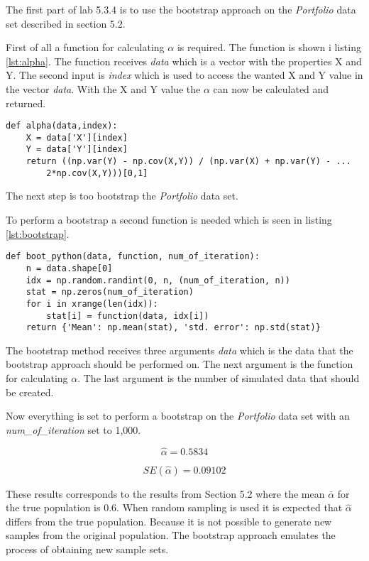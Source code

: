The first part of lab 5.3.4 is to use the bootstrap approach on the \emph{Portfolio} data set described in section 5.2\citep{ISLR}.

First of all a function for calculating $\alpha$ is required. The function is shown i listing \ref{lst:alpha}. The function receives \emph{data} which is a vector with the properties X and Y. The second input is \emph{index} which is used to access the wanted X and Y value in the vector \emph{data}.
With the X and Y value the $\alpha$ can now be calculated and returned.

\begin{lstlisting}[caption={Function for calculating $\alpha$ in python}, label=lst:alpha, mathescape=true]
def alpha(data,index):
	X = data['X'][index]
	Y = data['Y'][index]
	return ((np.var(Y) - np.cov(X,Y)) / (np.var(X) + np.var(Y) - ...
		2*np.cov(X,Y)))[0,1]
\end{lstlisting}

The next step is too bootstrap the \emph{Portfolio} data set.

To perform a bootstrap a second function is needed which is seen in listing \ref{lst:bootstrap}.

\begin{lstlisting}[caption={Bootstrap function in python}, label=lst:bootstrap, mathescape=true]
def boot_python(data, function, num_of_iteration):
	n = data.shape[0]
	idx = np.random.randint(0, n, (num_of_iteration, n))
	stat = np.zeros(num_of_iteration)
	for i in xrange(len(idx)):
		stat[i] = function(data, idx[i])
	return {'Mean': np.mean(stat), 'std. error': np.std(stat)}
\end{lstlisting}

The bootstrap method receives three arguments \emph{data} which is the data that the bootstrap approach should be performed on. The next argument is the function for calculating $\alpha$. The last argument is the number of simulated data that should be created.  

Now everything is set to perform a bootstrap on the \emph{Portfolio} data set with an \emph{num\_of\_iteration} set to 1,000.

\begin{equation}
\hat{\alpha} = 0.5834
\end{equation}

\begin{equation}
SE(\hat{\alpha}) = 0.09102
\end{equation}

These results corresponds to the results from Section 5.2\citep{ISLR} where the mean $\bar{\alpha}$ for the true population is 0.6. When  random sampling is used it is expected that $\hat{\alpha}$ differs from the true population. Because it is not possible to generate new samples from the original population. The bootstrap approach emulates the process of obtaining new sample sets.

